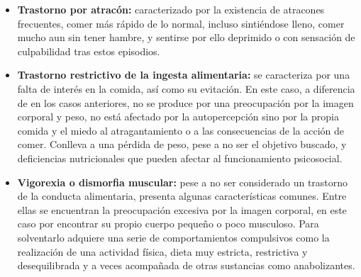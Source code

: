 \documentclass[12pt, a4paper,twoside,titlepage]{book}
\begin{document}
\begin{itemize}
{\begin{itemize}
            \item {\textbf{Trastorno por atracón:}  caracterizado por la existencia de atracones frecuentes, comer más rápido de lo normal, incluso sintiéndose lleno, comer mucho aun sin tener hambre, y sentirse por ello deprimido o con sensación de culpabilidad tras estos episodios. }    
             \item {\textbf{Trastorno restrictivo de la ingesta alimentaria:}  se caracteriza por una falta de interés en la comida, así como su evitación. En este caso, a diferencia de en los casos anteriores, no se produce por una preocupación por la imagen corporal y peso, no está afectado por la autopercepción sino por la propia comida y el miedo al atragantamiento o a las consecuencias de la acción de comer. Conlleva a una pérdida de peso, pese a no ser el objetivo buscado, y deficiencias nutricionales que pueden afectar al funcionamiento psicosocial.}
             \item {\textbf{Vigorexia o dismorfia muscular:}  pese a no ser considerado un trastorno de la conducta alimentaria, presenta algunas características comunes. Entre ellas se encuentran la preocupación excesiva por la imagen corporal, en este caso por encontrar su propio cuerpo pequeño o poco musculoso. Para solventarlo adquiere una serie de comportamientos compulsivos como la realización de una actividad física, dieta muy estricta, restrictiva y desequilibrada y a veces acompañada de otras sustancias como anabolizantes. } 
        \end{itemize}
    
}
\end{itemize}
\end{document}
